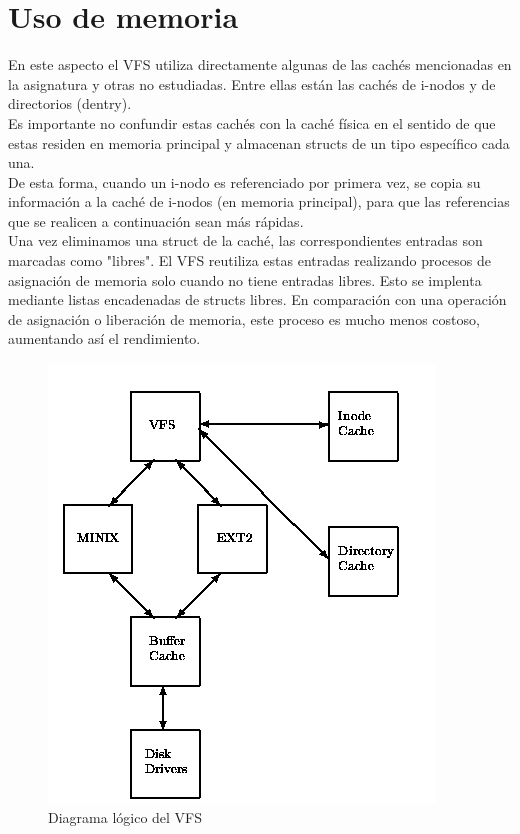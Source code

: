 \documentclass[11pt,a4paper]{article}
\newcommand\tab[1][1cm]{\hspace*{#1}}
\begin{document}
\section{Uso de memoria}

\tab En este aspecto el VFS utiliza directamente algunas de las cachés mencionadas en la asignatura y otras no estudiadas. Entre ellas están las cachés de i-nodos y de directorios (dentry). \\

\tab Es importante no confundir estas cachés con la caché física en el sentido de que estas residen en memoria principal y almacenan structs de un tipo específico cada una. \\

\tab De esta forma, cuando un i-nodo es referenciado por primera vez, se copia su información a la caché de i-nodos (en memoria principal), para que las referencias que se realicen a continuación sean más rápidas. \\

\tab Una vez eliminamos una struct de la caché, las correspondientes entradas son marcadas como "libres". El VFS reutiliza estas entradas realizando procesos de asignación de memoria solo cuando no tiene entradas libres. Esto se implenta mediante listas encadenadas de structs libres. En comparación con una operación de asignación o liberación de memoria, este proceso es mucho menos costoso, aumentando así el rendimiento. \cite{politecnica} \\

\begin{figure}[H]
  \centering
 	\includegraphics[scale=0.65]{capturas/cache}
 	\caption{Diagrama lógico del VFS \cite{trento}} \label{fig:YA AQUI}
\end{figure}
\end{document}
